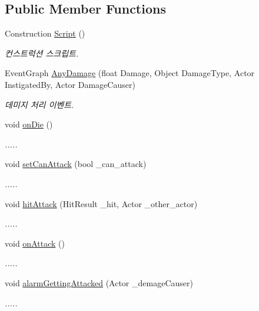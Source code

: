 \subsection*{Public Member Functions}
\begin{DoxyCompactItemize}
\item 
Construction \hyperlink{class_enemy___character_a96c9dc103aa4bcb4ee3a5c8d6dfe340b}{Script} ()
\begin{DoxyCompactList}\small\item\em 컨스트럭션 스크립트. \end{DoxyCompactList}\item 
Event\+Graph \hyperlink{class_enemy___character_ae989f213471b46262de4e372ecbe5c63}{Any\+Damage} (float Damage, Object Damage\+Type, Actor Instigated\+By, Actor Damage\+Causer)
\begin{DoxyCompactList}\small\item\em 데미지 처리 이벤트. \end{DoxyCompactList}\item 
void \hyperlink{class_enemy___character_a1a017228dd07231176118c82ea0ae4cf}{on\+Die} ()
\begin{DoxyCompactList}\small\item\em ..... \end{DoxyCompactList}\item 
void \hyperlink{class_enemy___character_abf821a2be938d0686caf45fa6c738af7}{set\+Can\+Attack} (bool \+\_\+can\+\_\+attack)
\begin{DoxyCompactList}\small\item\em ..... \end{DoxyCompactList}\item 
void \hyperlink{class_enemy___character_a74b04f0f28f9122e6474da8ae03abe57}{hit\+Attack} (Hit\+Result \+\_\+hit, Actor \+\_\+other\+\_\+actor)
\begin{DoxyCompactList}\small\item\em ..... \end{DoxyCompactList}\item 
void \hyperlink{class_enemy___character_acafb348c1628d5a141d161c03189b4fe}{on\+Attack} ()
\begin{DoxyCompactList}\small\item\em ..... \end{DoxyCompactList}\item 
void \hyperlink{class_enemy___character_aa4f5af02eb960516ca6134a0e84e958a}{alarm\+Getting\+Attacked} (Actor \+\_\+demage\+Causer)
\begin{DoxyCompactList}\small\item\em ..... \end{DoxyCompactList}\item 

\end{DoxyCompactItemize}
